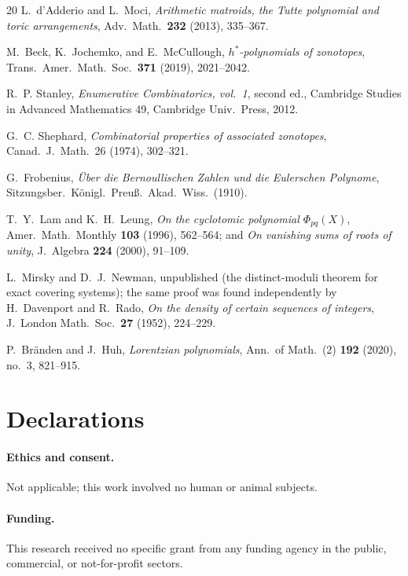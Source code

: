 \documentclass[11pt,a4paper]{article}
\numberwithin{equation}{section}
\theoremstyle{plain}
\theoremstyle{definition}
\theoremstyle{remark}
\begin{document}
\begin{thebibliography}{20}
L.~d'Adderio and L.~Moci,
\emph{Arithmetic matroids, the Tutte polynomial and toric
arrangements},
Adv.\ Math.\ \textbf{232} (2013), 335--367.

M.~Beck, K.~Jochemko, and E.~McCullough,
\emph{$h^*$-polynomials of zonotopes},
Trans.\ Amer.\ Math.\ Soc.\ \textbf{371} (2019), 2021--2042.

R.~P. Stanley,
\emph{Enumerative Combinatorics, vol.~1}, second ed.,
Cambridge Studies in Advanced Mathematics 49, Cambridge Univ.\ Press,
2012.

G.~C. Shephard,
\emph{Combinatorial properties of associated zonotopes},
Canad.\ J.\ Math.\ 26 (1974), 302--321.

G.~Frobenius,
\emph{\"Uber die Bernoullischen Zahlen und die Eulerschen Polynome},
Sitzungsber.\ K\"onigl.\ Preu\ss.\ Akad.\ Wiss.\ (1910).

T.~Y.~Lam and K.~H.~Leung,
\emph{On the cyclotomic polynomial $\Phi_{pq}(X)$},
Amer.\ Math.\ Monthly \textbf{103} (1996), 562--564; and
\emph{On vanishing sums of roots of unity},
J.\ Algebra \textbf{224} (2000), 91--109.

L.~Mirsky and D.~J.~Newman,
unpublished (the distinct-moduli theorem for exact covering systems);
the same proof was found independently by
H.~Davenport and R.~Rado,
\emph{On the density of certain sequences of integers},
J.\ London Math.\ Soc.\ \textbf{27} (1952), 224--229.

P.~Br\"anden and J.~Huh,
\emph{Lorentzian polynomials},
Ann.\ of Math.\ (2) \textbf{192} (2020), no.~3, 821--915.

\end{thebibliography}
\endgroup


\section*{Declarations}

\paragraph{Ethics and consent.} Not applicable; this work involved no
human or animal subjects.

\paragraph{Funding.} This research received no specific grant from any
funding agency in the public, commercial, or not-for-profit sectors.
\end{document}
